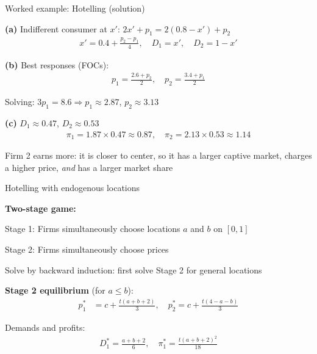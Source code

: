 \documentclass[notes,11pt, aspectratio=169]{beamer}
\newenvironment{wideitemize}{\itemize\addtolength{\itemsep}{10pt}}{\enditemize}
\newenvironment{wideenumerate}{\enumerate\addtolength{\itemsep}{10pt}}{\endenumerate}
\begin{document}
\begin{frame}{Worked example: Hotelling (solution)}
	\begin{wideitemize}
		\item \textbf{(a)} Indifferent consumer at $x'$: $2x' + p_1 = 2(0.8 - x') + p_2$
		\begin{align*}
			x' = 0.4 + \frac{p_2 - p_1}{4}, \quad D_1 = x', \quad D_2 = 1 - x'
		\end{align*}
		\item \textbf{(b)} Best responses (FOCs):
		\begin{align*}
			p_1 = \frac{2.6 + p_2}{2}, \quad p_2 = \frac{3.4 + p_1}{2}
		\end{align*}
		\item Solving: $3p_1 = 8.6 \Rightarrow p_1 \approx 2.87$, \quad $p_2 \approx 3.13$
		\item \textbf{(c)} $D_1 \approx 0.47$, $D_2 \approx 0.53$
		\begin{align*}
			\pi_1 = 1.87 \times 0.47 \approx 0.87, \quad \pi_2 = 2.13 \times 0.53 \approx 1.14
		\end{align*}
		\item Firm 2 earns more: it is closer to center, so it has a larger captive market, charges a higher price, \textit{and} has a larger market share
	\end{wideitemize}
\end{frame}


\begin{frame}{Hotelling with endogenous locations}
	\begin{wideitemize}
		\item \textbf{Two-stage game:}
		\begin{wideenumerate}
			\vspace{5pt}
			\item Stage 1: Firms simultaneously choose locations $a$ and $b$ on $[0,1]$
			\item Stage 2: Firms simultaneously choose prices
		\end{wideenumerate}
		\item Solve by backward induction: first solve Stage 2 for general locations
		\item \textbf{Stage 2 equilibrium} (for $a \leq b$):
		\begin{align*}
			p_1^* &= c + \frac{t(a + b + 2)}{3}, \quad p_2^* = c + \frac{t(4 - a - b)}{3}
		\end{align*}
		\item Demands and profits:
		\begin{align*}
			D_1^* = \frac{a + b + 2}{6}, \quad \pi_1^* = \frac{t(a + b + 2)^2}{18}
		\end{align*}
	\end{wideitemize}
\end{frame}
\end{document}
